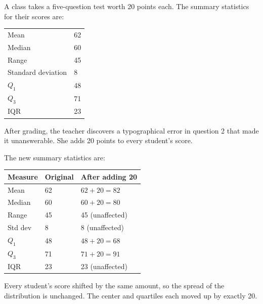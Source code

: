 \begin{Worked}
\begin{Problem}
A class takes a five-question test worth 20 points
each. The summary statistics for their scores are:

\begin{center}
\begin{tabular}{ll}
Mean & 62 \\
Median & 60 \\
Range & 45 \\
Standard deviation & 8 \\
$Q_1$ & 48 \\
$Q_3$ & 71 \\
IQR & 23 \\
\end{tabular}
\end{center}

After grading, the teacher discovers a typographical error in question
2 that made it unanswerable. She adds 20 points to every student's
score.
\end{Problem}
\begin{Solution}
The new summary statistics are:

\begin{center}
\begin{tabular}{lll}
\textbf{Measure} & \textbf{Original} & \textbf{After adding 20} \\
\hline
Mean        & 62 & $62 + 20 = 82$ \\
Median      & 60 & $60 + 20 = 80$ \\
Range       & 45 & 45 (unaffected) \\
Std dev     & 8  & 8 (unaffected) \\
$Q_1$       & 48 & $48 + 20 = 68$ \\
$Q_3$       & 71 & $71 + 20 = 91$ \\
IQR         & 23 & 23 (unaffected) \\
\end{tabular}
\end{center}

Every student's score shifted by the same amount, so the spread of
the distribution is unchanged. The center and quartiles each moved
up by exactly 20.
\end{Solution}
\end{Worked}

